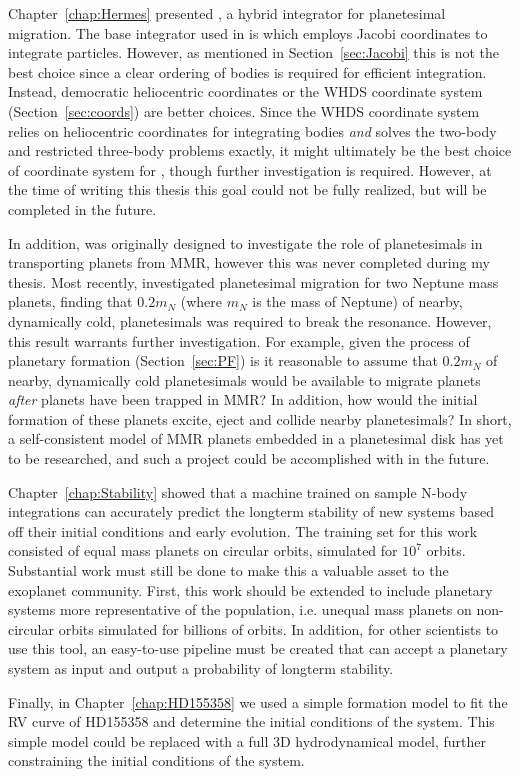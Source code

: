 Chapter~\ref{chap:Hermes} presented \hermes, a hybrid integrator for planetesimal migration. 
The base integrator used in \hermes is \whfast which employs Jacobi coordinates to integrate particles.
However, as mentioned in Section~\ref{sec:Jacobi} this is not the best choice since a clear ordering of bodies is required for efficient integration.
Instead, democratic heliocentric coordinates or the WHDS coordinate system (Section~\ref{sec:coords}) are better choices. 
Since the WHDS coordinate system relies on heliocentric coordinates for integrating bodies \textit{and} solves the two-body and restricted three-body problems exactly, it might ultimately be the best choice of coordinate system for \hermes, though further investigation is required. 
However, at the time of writing this thesis this goal could not be fully realized, but will be completed in the future.

In addition, \hermes was originally designed to investigate the role of planetesimals in transporting planets from MMR, however this was never completed during my thesis. 
Most recently, \citet{Chatterjee2015} investigated planetesimal migration for two Neptune mass planets, finding that $0.2m_N$ (where $m_N$ is the mass of Neptune) of nearby, dynamically cold, planetesimals was required to break the resonance. 
However, this result warrants further investigation. 
For example, given the process of planetary formation (Section~\ref{sec:PF}) is it reasonable to assume that $0.2m_N$ of nearby, dynamically cold planetesimals would be available to migrate planets \textit{after} planets have been trapped in MMR?
In addition, how would the initial formation of these planets excite, eject and collide nearby planetesimals?
In short, a self-consistent model of MMR planets embedded in a planetesimal disk has yet to be researched, and such a project could be accomplished with \hermes in the future.

Chapter~\ref{chap:Stability} showed that a machine trained on sample N-body integrations can accurately predict the longterm stability of new systems based off their initial conditions and early evolution. 
The training set for this work consisted of equal mass planets on circular orbits, simulated for $10^7$ orbits. 
Substantial work must still be done to make this a valuable asset to the exoplanet community.
First, this work should be extended to include planetary systems more representative of the \kep population, i.e. unequal mass planets on non-circular orbits simulated for billions of orbits. 
In addition, for other scientists to use this tool, an easy-to-use pipeline must be created that can accept a planetary system as input and output a probability of longterm stability. 

Finally, in Chapter~\ref{chap:HD155358} we used a simple formation model to fit the RV curve of HD155358 and determine the initial conditions of the system. 
This simple model could be replaced with a full 3D hydrodynamical model, further constraining the initial conditions of the system. 


